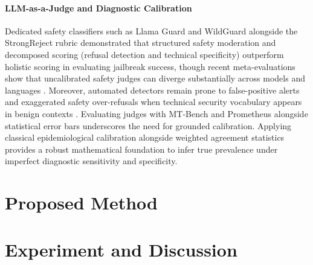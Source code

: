 \documentclass[11pt]{article}
\begin{document}
\paragraph{LLM-as-a-Judge and Diagnostic Calibration}
Dedicated safety classifiers such as Llama Guard \cite{inan2023llamaguard} and WildGuard \cite{han2024wildguard} alongside the StrongReject rubric \cite{strongreject2024} demonstrated that structured safety moderation and decomposed scoring (refusal detection and technical specificity) outperform holistic scoring in evaluating jailbreak success, though recent meta-evaluations show that uncalibrated safety judges can diverge substantially across models and languages \cite{beyer2025llmsafety}. Moreover, automated detectors remain prone to false-positive alerts and exaggerated safety over-refusals when technical security vocabulary appears in benign contexts \cite{rottger2023xstest,shaikh2023second}. Evaluating judges with MT-Bench \cite{zheng2023judging} and Prometheus \cite{kim2023prometheus} alongside statistical error bars \cite{miller2024adding} underscores the need for grounded calibration. Applying classical epidemiological calibration \cite{rogan1978estimating} alongside weighted agreement statistics \cite{cohen1968weighted,landis1977measurement} provides a robust mathematical foundation to infer true prevalence under imperfect diagnostic sensitivity and specificity.

\section{Proposed Method}
\label{sec:proposed_method}




\section{Experiment and Discussion}
\label{sec:experiment_and_discussion}
\label{sec:experiments}



\end{document}
